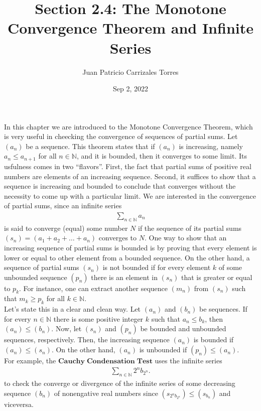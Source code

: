 \documentclass[12pt]{article}
\newcommand{\N}{\mathbb{N}}
\begin{document}
  
\title{Section 2.4: The Monotone Convergence Theorem and Infinite Series}
   \author{Juan Patricio Carrizales Torres}
     \date{Sep 2, 2022}
       \maketitle

       In this chapter we are introduced to the Monotone Convergence Theorem, which is very useful in cheecking the convergence of sequences of partial sums. Let $(a_{n})$ be a sequence. This theorem states that if $(a_{n})$ is increasing, namely $a_{n} \leq a_{n+1}$ for all $n\in \N$, and it is bounded, then it converges to some limit. Its usfulness comes in two ``flavors''. First, the fact that partial sums of positive real numbers are elements of an increasing sequence. Second, it suffices to show that a sequence is increasing and bounded to conclude that converges without the necessity to come up with a particular limit. 
       We are interested in the convergence of partial sums, since an infinite series
\begin{align*}
  \sum_{n\in\N} a_{n}
\end{align*}
is said to converge (equal) some number $N$ if the sequence of its partial sums $(s_{n}) = (a_{1}+a_{2}+\dots+a_{n})$ converges to $N$. 
One way to show that an increasing sequence of partial sums  is bounded is by proving that every element is lower or equal to other element from a bounded sequence. On the other hand, a sequence of partial sums $(s_{n})$ is not bounded if for every element $k$ of some unbounded sequence $(p_{n})$ there is an element in $(s_{n})$ that is greater or equal to $p_{k}$. For instance, one can extract another sequence $(m_{n})$ from $(s_{n})$ such that $m_{k} \geq p_{k}$ for all $k\in\N$.\\
Let's state this in a clear and clean way. Let $(a_{n})$ and $(b_{n})$ be sequences. If for every $n\in\N$ there is some positive integer $k$ such that $a_{n}\leq b_{k}$, then $(a_{n})\leq (b_{n})$. Now, let $(s_{n})$ and $(p_{n})$ be bounded and unbounded sequences, respectively. Then, the increasing sequence $(a_{n})$ is bounded if $(a_{n})\leq (s_{n})$. On the other hand, $(a_{n})$ is unbounded if $(p_{n}) \leq (a_{n})$.\\

For example, the  $\mathbf{Cauchy \; Condensation \; Test}$ uses the infinite series
\begin{align*}
  \sum_{n\in\N} 2^{n}b_{2^{n}}.
\end{align*}
to check the converge or divergence of the infinite series of some decreasing sequence $(b_{n})$ of nonengative real numbers since $(s_{2^{n}b_{2^{n}}}) \leq (s_{b_{n}})$ and viceversa.
\end{document}
